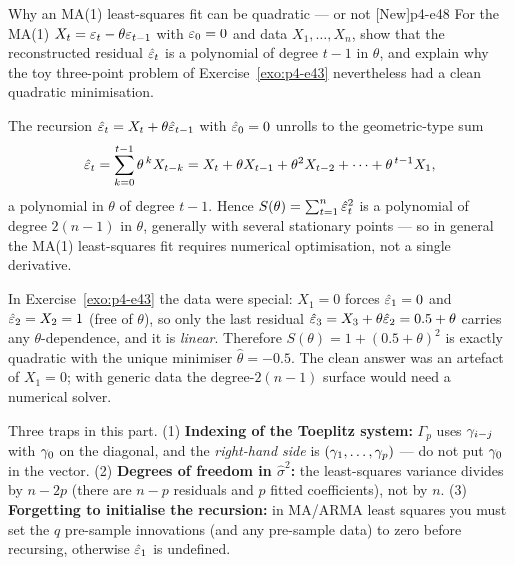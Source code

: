 \begin{exercise}{Why an MA(1) least-squares fit can be quadratic --- or not \quad\textnormal{[New]}}{p4-e48}
For the MA(1) $X_t=\varepsilon_t-\theta\varepsilon_{t-1}$ with $\varepsilon_0=0$ and data
$X_1,\dots,X_n$, show that the reconstructed residual $\hat{\varepsilon}_t$ is a
polynomial of degree $t-1$ in $\theta$, and explain why the toy three-point
problem of Exercise~\ref{exo:p4-e43} nevertheless had a clean quadratic
minimisation.
\end{exercise}
\begin{solution}
The recursion $\hat{\varepsilon}_t=X_t+\theta\hat{\varepsilon}_{t-1}$ with $\hat{\varepsilon}_0=0$ unrolls
to the geometric-type sum
\[
\hat{\varepsilon}_t=\sum_{k=0}^{t-1}\theta^{\,k}X_{t-k}
=X_t+\theta X_{t-1}+\theta^2X_{t-2}+\cdots+\theta^{\,t-1}X_1,
\]
a polynomial in $\theta$ of degree $t-1$. Hence
$S(\theta)=\sum_{t=1}^n\hat{\varepsilon}_t^2$ is a polynomial of degree $2(n-1)$ in
$\theta$, generally with several stationary points --- so in general the MA(1)
least-squares fit requires numerical optimisation, not a single derivative.

In Exercise~\ref{exo:p4-e43} the data were special: $X_1=0$ forces
$\hat{\varepsilon}_1=0$ and $\hat{\varepsilon}_2=X_2=1$ (free of $\theta$), so only the last
residual $\hat{\varepsilon}_3=X_3+\theta\hat{\varepsilon}_2=0.5+\theta$ carries any
$\theta$-dependence, and it is \emph{linear}. Therefore
$S(\theta)=1+(0.5+\theta)^2$ is exactly quadratic with the unique minimiser
$\hat\theta=-0.5$. The clean answer was an artefact of $X_1=0$; with generic
data the degree-$2(n-1)$ surface would need a numerical solver.
\end{solution}

\begin{pitfall}
Three traps in this part. (1) \textbf{Indexing of the Toeplitz system:}
$\Gamma_p$ uses $\gamma_{i-j}$ with $\gamma_0$ on the diagonal, and the
\emph{right-hand side} is $(\gamma_1,\dots,\gamma_p)$ --- do not put $\gamma_0$ in
the vector. (2) \textbf{Degrees of freedom in $\hat\sigma^2$:} the least-squares
variance divides by $n-2p$ (there are $n-p$ residuals and $p$ fitted
coefficients), not by $n$. (3) \textbf{Forgetting to initialise the
recursion:} in MA/ARMA least squares you must set the $q$ pre-sample
innovations (and any pre-sample data) to zero before recursing, otherwise
$\hat{\varepsilon}_1$ is undefined.
\end{pitfall}
